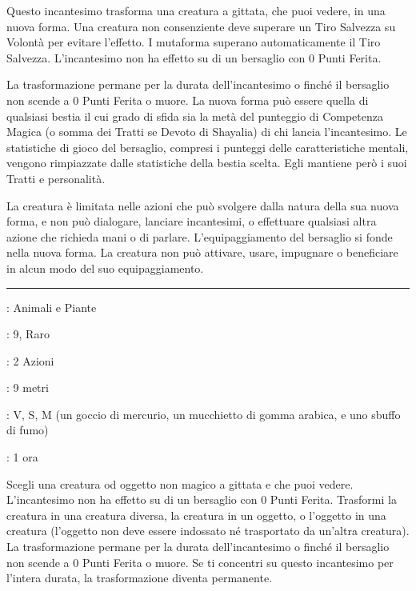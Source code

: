 \begin{multicols}{2}
Questo incantesimo trasforma una creatura a gittata, che puoi vedere, in una nuova forma. Una creatura non consenziente deve superare un Tiro Salvezza su Volontà per evitare l'effetto. I mutaforma superano automaticamente il Tiro Salvezza. L'incantesimo non ha effetto su di un bersaglio con 0 Punti Ferita.

La trasformazione permane per la durata dell'incantesimo o finché il bersaglio non scende a 0 Punti Ferita o muore. La nuova forma può essere quella di qualsiasi bestia il cui grado di sfida sia la metà del punteggio di Competenza Magica (o somma dei Tratti se Devoto di Shayalia) di chi lancia l'incantesimo. Le statistiche di gioco del bersaglio, compresi i punteggi delle caratteristiche mentali, vengono rimpiazzate dalle statistiche della bestia scelta. Egli mantiene però i suoi Tratti e personalità.

La creatura è limitata nelle azioni che può svolgere dalla natura della sua nuova forma, e non può dialogare, lanciare incantesimi, o effettuare qualsiasi altra azione che richieda mani o di parlare. L'equipaggiamento del bersaglio si fonde nella nuova forma. La creatura non può attivare, usare, impugnare o beneficiare in alcun modo del suo equipaggiamento.

\smallskip\noindent\rule{\linewidth}{2pt} \hypertarget{Metamorfosi Pura}{}\smallskip{}
\noindent
\begin{description}[noitemsep, topsep=0pt, parsep=0pt, partopsep=0pt, leftmargin=0cm, labelwidth=2.8cm]
	\item[\textbf{Lista di Magia}]: Animali e Piante
	\item[\textbf{Livello}]: 9, Raro
	\item[\textbf{T. di Lancio}]: 2 Azioni
	\item[\textbf{Gittata}]: 9 metri
	\item[\textbf{Componenti}]: V, S, M (un goccio di mercurio, un mucchietto di gomma arabica, e uno sbuffo di fumo)
	\item[\textbf{Durata}]: 1 ora
\end{description}

Scegli una creatura od oggetto non magico a gittata e che puoi vedere. L'incantesimo non ha effetto su di un bersaglio con 0 Punti Ferita. Trasformi la creatura in una creatura diversa, la creatura in un oggetto, o l'oggetto in una creatura (l'oggetto non deve essere indossato né trasportato da un'altra creatura). La trasformazione permane per la durata dell'incantesimo o finché il bersaglio non scende a 0 Punti Ferita o muore. Se ti concentri su questo incantesimo per l'intera durata, la trasformazione diventa permanente.


\end{multicols}
